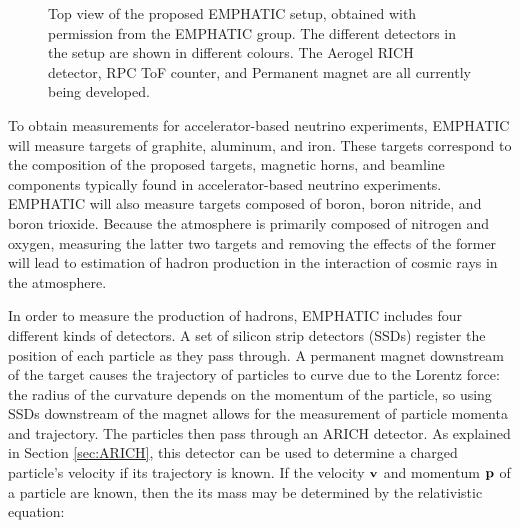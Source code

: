 \begin{figure}[] 
\centering
{}
\caption[Top view of \ac{EMPHATIC}]{Top view of the proposed \ac{EMPHATIC} setup, obtained with permission from the \ac{EMPHATIC} group. The different detectors in the setup are shown in different colours. The Aerogel RICH detector, RPC ToF counter, and Permanent magnet are all currently being developed.}

\label{fig:EMPHATIC}       %
\end{figure}

To obtain measurements for accelerator-based neutrino experiments, \ac{EMPHATIC} will measure targets of graphite, aluminum, and iron.
These targets correspond to the composition of the proposed targets, magnetic horns, and beamline components typically found in accelerator-based neutrino experiments.
\ac{EMPHATIC} will also measure targets composed of boron, boron nitride, and boron trioxide.
Because the atmosphere is primarily composed of nitrogen and oxygen, measuring the latter two targets and removing the effects of the former will lead to estimation of hadron production in the interaction of cosmic rays in the atmosphere. 

In order to measure the production of hadrons, \ac{EMPHATIC} includes four different kinds of detectors.
A set of silicon strip detectors (SSDs) register the position of each particle as they pass through.
A permanent magnet downstream of the target causes the trajectory of particles to curve due to the Lorentz force: the radius of the curvature depends on the momentum of the particle, so using SSDs downstream of the magnet allows for the measurement of particle momenta and trajectory.
The particles then pass through an \ac{ARICH} detector.
As explained in Section \ref{sec:ARICH}, this detector can be used to determine a charged particle's velocity if its trajectory is known.
If the velocity $\bf{v}$ and momentum $\bf{p}$ of a particle are known, then the its mass may be determined by the relativistic equation:


